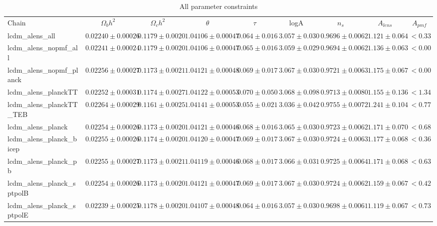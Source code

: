 \documentclass[preprint]{emulateapj}
\begin{document}
\begin{table}[h]
\begin{center}
\caption{\label{tab:param_all} All parameter constraints}
\tiny
\begin{tabular}{l || c c c c c c c | c}
Chain & $\Omega_b h^2$  & $\Omega_c h^2$  & $\theta$  & $\tau$  & logA  & $n_s$  & $A_{lens}$  & $A_{pmf}$ \\
lcdm\_alens\_all & $ 0.02240\pm  0.00026$ & $ 0.1179\pm  0.0020$ & $ 1.04106\pm  0.00047$ & $ 0.064\pm  0.016$ & $ 3.057\pm  0.030$ & $ 0.9696\pm  0.0062$ & $ 1.121 \pm  0.064$ & $< 0.33$ \\
lcdm\_alens\_nopmf\_all & $ 0.02241\pm  0.00024$ & $ 0.1179\pm  0.0020$ & $ 1.04106\pm  0.00047$ & $ 0.065\pm  0.016$ & $ 3.059\pm  0.029$ & $ 0.9694\pm  0.0062$ & $ 1.136 \pm  0.063$ & $< 0.00$ \\
lcdm\_alens\_nopmf\_planck & $ 0.02256\pm  0.00027$ & $ 0.1173\pm  0.0021$ & $ 1.04121\pm  0.00048$ & $ 0.069\pm  0.017$ & $ 3.067\pm  0.030$ & $ 0.9721\pm  0.0063$ & $ 1.175 \pm  0.067$ & $< 0.00$ \\
lcdm\_alens\_planckTT & $ 0.02252\pm  0.00031$ & $ 0.1174\pm  0.0027$ & $ 1.04122\pm  0.00053$ & $ 0.070\pm  0.050$ & $ 3.068\pm  0.098$ & $ 0.9713\pm  0.0080$ & $ 1.155 \pm  0.136$ & $< 1.34$ \\
lcdm\_alens\_planckTT\_TEB & $ 0.02264\pm  0.00029$ & $ 0.1161\pm  0.0025$ & $ 1.04141\pm  0.00053$ & $ 0.055\pm  0.021$ & $ 3.036\pm  0.042$ & $ 0.9755\pm  0.0072$ & $ 1.241 \pm  0.104$ & $< 0.77$ \\
lcdm\_alens\_planck & $ 0.02254\pm  0.00026$ & $ 0.1173\pm  0.0020$ & $ 1.04121\pm  0.00046$ & $ 0.068\pm  0.016$ & $ 3.065\pm  0.030$ & $ 0.9723\pm  0.0062$ & $ 1.171 \pm  0.070$ & $< 0.68$ \\
lcdm\_alens\_planck\_bicep & $ 0.02255\pm  0.00026$ & $ 0.1174\pm  0.0020$ & $ 1.04120\pm  0.00047$ & $ 0.069\pm  0.017$ & $ 3.067\pm  0.030$ & $ 0.9724\pm  0.0063$ & $ 1.177 \pm  0.068$ & $< 0.36$ \\
lcdm\_alens\_planck\_pb & $ 0.02255\pm  0.00027$ & $ 0.1173\pm  0.0021$ & $ 1.04119\pm  0.00046$ & $ 0.068\pm  0.017$ & $ 3.066\pm  0.031$ & $ 0.9725\pm  0.0064$ & $ 1.171 \pm  0.068$ & $< 0.63$ \\
lcdm\_alens\_planck\_sptpolB & $ 0.02254\pm  0.00026$ & $ 0.1173\pm  0.0020$ & $ 1.04121\pm  0.00047$ & $ 0.069\pm  0.017$ & $ 3.067\pm  0.030$ & $ 0.9724\pm  0.0062$ & $ 1.159 \pm  0.067$ & $< 0.42$ \\
lcdm\_alens\_planck\_sptpolE & $ 0.02239\pm  0.00025$ & $ 0.1178\pm  0.0020$ & $ 1.04107\pm  0.00048$ & $ 0.064\pm  0.016$ & $ 3.057\pm  0.030$ & $ 0.9698\pm  0.0061$ & $ 1.119 \pm  0.067$ & $< 0.73$ \\

\end{tabular}
\end{center}
\end{table}
\end{document}
